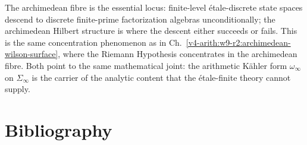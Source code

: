 The archimedean fibre is the essential locus: finite-level
\'etale-discrete state spaces descend to
discrete finite-prime factorization algebras unconditionally; the
archimedean Hilbert structure is where the descent either succeeds
or fails. This is the same concentration phenomenon
as in Ch.~\ref{v4-arith:w9-r2:archimedean-wilson-surface}, where
the Riemann Hypothesis concentrates in the archimedean fibre. Both
point to the same mathematical joint: the arithmetic K\"ahler form
\(\omega_{\infty}\) on \(\Sigma_{\infty}\) is the carrier of the
analytic content that the \'etale-finite theory cannot supply.

\section{Bibliography}
\label{v4-arith:w10-a:bibliography}

